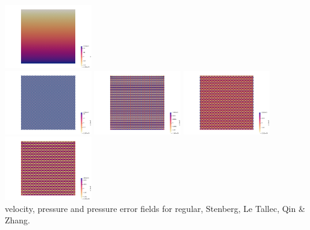\begin{center}
\includegraphics[width=3.8cm]{python_codes/fieldstone_78/results/aquarium/p3}\\
\includegraphics[width=3.8cm]{python_codes/fieldstone_78/results/aquarium/p_error_0}
\includegraphics[width=3.8cm]{python_codes/fieldstone_78/results/aquarium/p_error_1}
\includegraphics[width=3.8cm]{python_codes/fieldstone_78/results/aquarium/p_error_2}
\includegraphics[width=3.8cm]{python_codes/fieldstone_78/results/aquarium/p_error_3}\\
{\captionfont velocity, pressure and pressure error 
fields for regular, Stenberg, Le Tallec, Qin \& Zhang.} 
\end{center}

